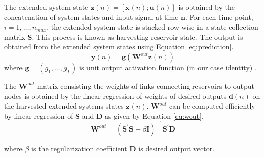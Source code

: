 
 The extended system state $\mathbf{z}(n) = [\mathbf{x}(n) ; \mathbf{u}(n)]$ is obtained 
 by the concatenation of system states and input signal at time $\mathbf{n}$. For each time point, $i = 1,\hdots ,n_{max}$, the extended system state is stacked row-wise in a state collection matrix $\mathbf{S}$. This process is known as harvesting reservoir state. The output is 
 obtained from the extended system states using Equation \eqref{eq:prediction}.
 \begin{equation} \label{eq:prediction}
   \mathbf{y}(n) = \mathbf{g}(\mathbf{W}^{out} \mathbf{z}(n) )
 \end{equation}
   where $\mathbf{g} = (g_1, \hdots,g_L)$ is unit output activation function (in our case identity) \cite{Jaeger:2007}.
  
   The $\mathbf{W}^{out}$ matrix consisting the weights of links connecting reservoirs to output nodes is obtained by the linear 
   regression of weights of desired outputs $\mathbf{d}(n)$ on the harvested 
   extended systems states $\mathbf{z}(n)$. $\mathbf{W}^{out}$ can be computed 
   efficiently by linear regression of $\mathbf{S}$ and $\mathbf{D}$ as given by Equation \eqref{eq:wout}.
   \begin{equation}\label{eq:wout}
 	\mathbf{W}^{out} =
      (\mathbf{S^{'}S} + \beta \mathbf{I})^{-1}\mathbf{S^{'}D}
      \end{equation}
     
      where $\beta$ is the regularization coefficient $\mathbf{D}$ is 
      desired output vector\cite{Jaeger:2007}.
      
